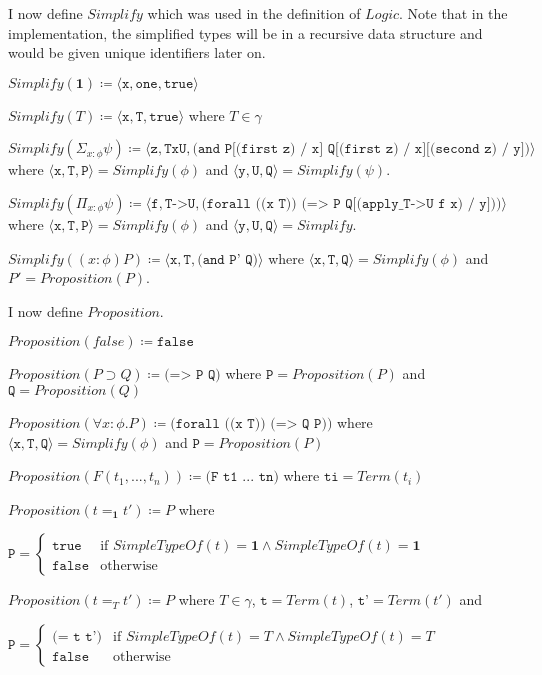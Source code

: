\documentclass[12pt,a4paper,titlepage]{article}
\newcommand{\triple}[3]{\langle \texttt{#1} , \texttt{#2} , \texttt{#3} \rangle}
\begin{document}
    I now define $Simplify$ which was used in the definition of $Logic$.
    Note that in the implementation, the simplified types will be in a recursive data structure and would
    be given unique identifiers later on.

    $Simplify(\textbf{1}) \coloneqq \triple{x}{one}{true}$

    $Simplify(T) \coloneqq \triple{x}{T}{true}$ where $T \in \gamma$

    $Simplify(\Sigma_{x:\phi} \psi) \coloneqq
    \triple{z}{TxU}{(and P[(first z) / x] Q[(first z) / x][(second z) / y])}$
    where $\triple{x}{T}{P} = Simplify(\phi)$ and $\triple{y}{U}{Q} = Simplify(\psi)$.

    $Simplify(\Pi_{x: \phi} \psi) \coloneqq
    \triple{f}{T->U}{(forall ((x T)) (=> P Q[(apply\_T->U f x) / y]))}$
    where $\triple{x}{T}{P} = Simplify(\phi)$ and $\triple{y}{U}{Q} = Simplify$.

    $Simplify((x: \phi)P) \coloneqq
    \triple{x}{T}{(and P' Q)}$
    where $\triple{x}{T}{Q} = Simplify(\phi)$ and $P' = Proposition(P)$.

    I now define $Proposition$.

    $Proposition(false) \coloneqq \texttt{false}$

    $Proposition(P \supset Q) \coloneqq \texttt{(=> P Q)}$
    where $\texttt{P} = Proposition(P)$ and $\texttt{Q} = Proposition(Q)$

    $Proposition(\forall x: \phi . P) \coloneqq \texttt{(forall ((x T)) (=> Q P))}$
    where $\triple{x}{T}{Q} = Simplify(\phi)$ and $\texttt{P} = Proposition(P)$

    $Proposition(F(t_1, ..., t_n)) \coloneqq \texttt{(F t1 ... tn)}$
    where $\texttt{ti} = Term(t_i)$

    $Proposition(t =_\textbf{1} t') \coloneqq P$
    where

    $\texttt{P} = \begin{cases}
        \texttt{true} & \text{if } SimpleTypeOf(t)=\textbf{1} \land SimpleTypeOf(t)=\textbf{1}\\
        \texttt{false} & \text{otherwise}
    \end{cases}$

    $Proposition(t =_T t') \coloneqq P$
    where $T \in \gamma$, $\texttt{t} = Term(t)$, $\texttt{t'} = Term(t')$ and

    $\texttt{P} = \begin{cases}
        \texttt{(= t t')} & \text{if } SimpleTypeOf(t)=T \land SimpleTypeOf(t)=T\\
        \texttt{false} & \text{otherwise}
    \end{cases}$
\end{document}
